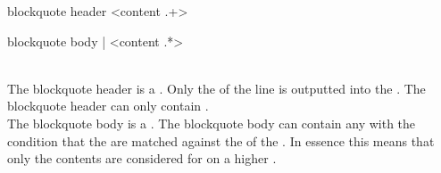 \begin{identifier}{blockquote header}
\* <content .+>
\end{identifier}
\begin{identifier}{blockquote body}
| <content .*>
\end{identifier}
 \\

The blockquote header is a . Only the  of the line is outputted into the . The blockquote header can only contain . \\

The blockquote body is a . The blockquote body can contain any  with the condition that the  are matched against the  of the . In essence this means that only the  contents are considered for  on a higher .

